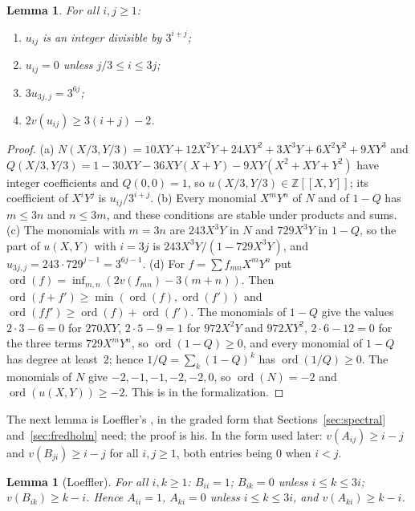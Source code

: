 \documentclass[11pt]{amsart}
\newtheorem{lemma}[theorem]{Lemma}
\theoremstyle{definition}
\numberwithin{equation}{section}
\newcommand{\lean}[1]{\ignorespaces}
\newcommand{\Z}{\mathbb{Z}}
\newcommand{\ord}{\operatorname{ord}}
\begin{document}
\begin{lemma}\label{lem:u}\lean{CalegariSlopes.Newton.u_dvd, CalegariSlopes.ADB.u_eq_zero_of_gt, CalegariSlopes.Spectral.u_eq_zero_of_lt, CalegariSlopes.ADB.u_corner, CalegariSlopes.Spectral.norm_u_sq_le}
For all $i,j\ge1$:
\begin{enumerate}
\item[(a)] $u_{ij}$ is an integer divisible by $3^{i+j}$;
\item[(b)] $u_{ij}=0$ unless $j/3\le i\le3j$;
\item[(c)] $3u_{3j,j}=3^{6j}$;
\item[(d)] $2v(u_{ij})\ge3(i+j)-2$.
\end{enumerate}
\end{lemma}

\begin{proof}
(a) $N(X/3,Y/3)=10XY+12X^2Y+24XY^2+3X^3Y+6X^2Y^2+9XY^3$ and $Q(X/3,Y/3)=1-30XY-36XY(X+Y)-9XY(X^2+XY+Y^2)$ have integer coefficients and $Q(0,0)=1$, so $u(X/3,Y/3)\in\Z[[X,Y]]$; its coefficient of $X^iY^j$ is $u_{ij}/3^{i+j}$. (b) Every monomial $X^mY^n$ of $N$ and of $1-Q$ has $m\le3n$ and $n\le3m$, and these conditions are stable under products and sums. (c) The monomials with $m=3n$ are $243X^3Y$ in $N$ and $729X^3Y$ in $1-Q$, so the part of $u(X,Y)$ with $i=3j$ is $243X^3Y/(1-729X^3Y)$, and $u_{3j,j}=243\cdot729^{j-1}=3^{6j-1}$. (d) For $f=\sum f_{mn}X^mY^n$ put $\ord(f)=\inf_{m,n}(2v(f_{mn})-3(m+n))$. Then $\ord(f+f')\ge\min(\ord(f),\ord(f'))$ and $\ord(ff')\ge\ord(f)+\ord(f')$. The monomials of $1-Q$ give the values $2\cdot3-6=0$ for $270XY$, $2\cdot5-9=1$ for $972X^2Y$ and $972XY^2$, $2\cdot6-12=0$ for the three terms $729X^mY^n$, so $\ord(1-Q)\ge0$, and every monomial of $1-Q$ has degree at least~$2$; hence $1/Q=\sum_k(1-Q)^k$ has $\ord(1/Q)\ge0$. The monomials of $N$ give $-2,-1,-1,-2,-2,0$, so $\ord(N)=-2$ and $\ord(u(X,Y))\ge-2$. This is  in the formalization.
\end{proof}

The next lemma is Loeffler's \cite[Lemma~3.1]{Loe08}, in the graded form that Sections~\ref{sec:spectral} and~\ref{sec:fredholm} need; the proof is his. In the form used later: $v(A_{ij})\ge i-j$ and $v(B_{ji})\ge i-j$ for all $i,j\ge1$, both entries being $0$ when $i<j$.

\begin{lemma}[Loeffler]\label{lem:AB}\lean{CalegariSlopes.Newton.norm_B_le, CalegariSlopes.ADB.B_self, CalegariSlopes.ADB.B_eq_zero_of_lt, CalegariSlopes.ADB.B_eq_zero_of_gt, CalegariSlopes.Newton.norm_A_le, CalegariSlopes.Newton.A_self, CalegariSlopes.Newton.A_eq_zero_of_lt}
For all $i,k\ge1$: $B_{ii}=1$; $B_{ik}=0$ unless $i\le k\le3i$; $v(B_{ik})\ge k-i$. Hence $A_{ii}=1$, $A_{ki}=0$ unless $i\le k\le3i$, and $v(A_{ki})\ge k-i$.
\end{lemma}
\end{document}
